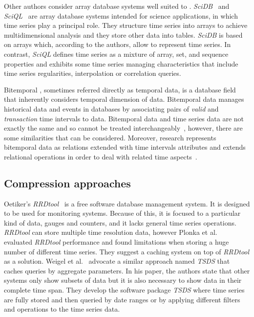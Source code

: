 Other authors consider array database systems well suited to
.  \emph{SciDB}~\cite{stonebraker09:scidb} and
\emph{SciQL}~\cite{zhang11} are array database systems intended for
science applications, in which time series play a principal role. They
structure time series into arrays to achieve multidimensional analysis
and they store other data into tables.  \emph{SciDB} is based on
arrays which, according to the authors, allow to represent time
series.  In contrast, \emph{SciQL} defines time series as a mixture of
array, set, and sequence properties and exhibits some time series
managing characteristics that include time series regularities,
interpolation or correlation queries.


Bitemporal , sometimes referred directly as temporal data,
is a database field that inherently considers temporal dimension of
data. Bitemporal data manages historical data and events in databases
by associating pairs of \emph{valid} and \emph{transaction} time
intervals to data.  Bitemporal data and time series data are not
exactly the same and so cannot be treated
interchangeably~\cite{schmidt95}, however, there are some similarities
that can be considered. Moreover,  research represents
bitemporal data as relations extended with time intervals attributes
and extends relational operations in order to deal with related time
aspects~\cite{jensen99:temporaldata,date02:_tempor_data_relat_model}.



\subsection{Compression approaches}

Oetiker's \emph{RRDtool}~\cite{rrdtool,lisa98:oetiker} is a free
software database management system. It is designed to be used for
monitoring systems. Because of this, it is focused to a particular
kind of data, gauges and counters, and it lacks general time series
operations. \emph{RRDtool} can store multiple time resolution data,
however Plonka et al.~\cite{lisa07:plonka} evaluated \emph{RRDtool}
performance and found limitations when storing a huge number of
different time series. They suggest a caching system on top of
\emph{RRDtool} as a solution.
%
Weigel et al.~\cite{weigel10} advocate a similar approach named
\emph{TSDS} that caches queries by aggregate parameters.  In his
paper, the authors state that other systems only show subsets of data
but it is also necessary to show data in their complete time span.
They develop the software package \emph{TSDS} where time series are
fully stored and then queried by date ranges or by applying different
filters and operations to the time series data.  

